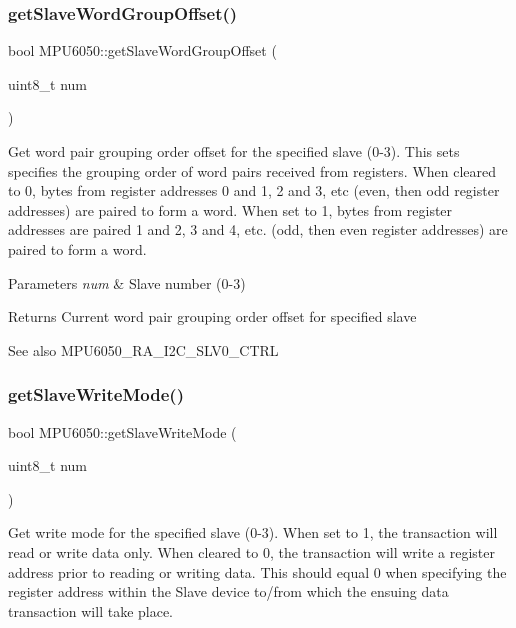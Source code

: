 \subsubsection{\texorpdfstring{getSlaveWordGroupOffset()}{getSlaveWordGroupOffset()}}
{\footnotesize\ttfamily bool M\+P\+U6050\+::get\+Slave\+Word\+Group\+Offset (\begin{DoxyParamCaption}\item[{uint8\+\_\+t}]{num }\end{DoxyParamCaption})}

Get word pair grouping order offset for the specified slave (0-\/3). This sets specifies the grouping order of word pairs received from registers. When cleared to 0, bytes from register addresses 0 and 1, 2 and 3, etc (even, then odd register addresses) are paired to form a word. When set to 1, bytes from register addresses are paired 1 and 2, 3 and 4, etc. (odd, then even register addresses) are paired to form a word.


\begin{DoxyParams}{Parameters}
{\em num} & Slave number (0-\/3) \\
\hline
\end{DoxyParams}
\begin{DoxyReturn}{Returns}
Current word pair grouping order offset for specified slave 
\end{DoxyReturn}
\begin{DoxySeeAlso}{See also}
M\+P\+U6050\+\_\+\+R\+A\+\_\+\+I2\+C\+\_\+\+S\+L\+V0\+\_\+\+C\+T\+RL 
\end{DoxySeeAlso}
\mbox{\label{class_m_p_u6050_adb99955fa66300b1f0bedfcdd8187412}} 
\subsubsection{\texorpdfstring{getSlaveWriteMode()}{getSlaveWriteMode()}}
{\footnotesize\ttfamily bool M\+P\+U6050\+::get\+Slave\+Write\+Mode (\begin{DoxyParamCaption}\item[{uint8\+\_\+t}]{num }\end{DoxyParamCaption})}

Get write mode for the specified slave (0-\/3). When set to 1, the transaction will read or write data only. When cleared to 0, the transaction will write a register address prior to reading or writing data. This should equal 0 when specifying the register address within the Slave device to/from which the ensuing data transaction will take place.


